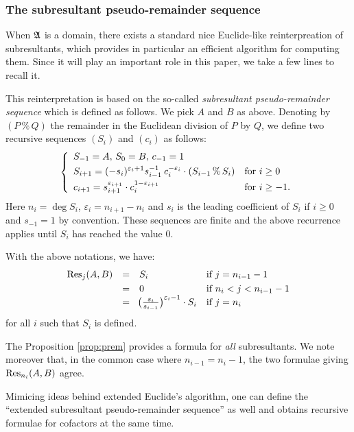\documentclass{article}
\begin{document}
\subsubsection*{The subresultant pseudo-remainder sequence}

When $\mathfrak A$ is a domain, there exists a standard nice Euclide-like
reinterpreation of subresultants, which provides in particular an 
efficient algorithm for computing them. Since it will play an important 
role in this paper, we take a few lines to recall it.

This reinterpretation is based on the so-called \emph{subresultant 
pseudo-remainder sequence} which is defined as follows. We pick $A$ and 
$B$ as above. Denoting by $(P \,\%\, Q)$ 
the remainder in the Euclidean division of $P$ by $Q$, we define two 
recursive sequences $(S_i)$ and $(c_i)$ as follows:
\begin{equation}
\label{eq:subressequence}
\left\{\begin{array}{ll}
S_{-1} = A, \, S_0 = B, \, c_{-1} = 1 \smallskip \\
\displaystyle S_{i+1} = (-s_i)^{\varepsilon_i + 1}
s_{i-1}^{-1} \: c_i^{-\varepsilon_i} \cdot (S_{i-1} \,\%\, S_i)
& \text{for } i \geq 0 \smallskip \\
\displaystyle c_{i+1} = s_{i+1}^{\varepsilon_{i+1}} \cdot c_i^{1-\varepsilon_{i+1}}
& \text{for } i \geq -1. 
\end{array}\right.
\end{equation}
Here $n_i = \deg S_i$, $\varepsilon_i = n_{i+1} - n_i$ and $s_i$ is the 
leading coefficient of $S_i$ if $i \geq 0$ and $s_{-1} = 1$ by 
convention. These sequences are finite and the above recurrence applies 
until $S_i$ has reached the value $0$.

\begin{prop}
\label{prop:prem}
With the above notations, we have:
$$\begin{array}{rcll}
\Res_j(A,B) & = & S_i & \text{if } j = n_{i-1} - 1 \smallskip \\
& = & 0 & \text{if } n_i < j < n_{i-1} - 1 \\
& = & \!\big(\frac{s_i}{s_{i-1}}\big)^{\varepsilon_i-1} \cdot S_i & 
\text{if } j = n_i
\end{array}$$
for all $i$ such that $S_i$ is defined.
\end{prop}

\begin{rem}
The Proposition \ref{prop:prem} provides a formula for \emph{all} 
subresultants. We note moreover that, in the common case where $n_{i-1} 
= n_i - 1$, the two formulae giving $\text{\rm Res}_{n_i}(A,B)$ agree.

Mimicing ideas behind extended Euclide's algorithm, one can define the 
``extended subresultant pseudo-remainder sequence'' as well and obtains
recursive formulae for cofactors at the same time.
\end{rem}
\end{document}
